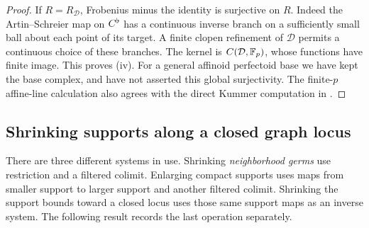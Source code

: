 \begin{proof}
If $R=R_{\mathcal D}$, Frobenius minus the identity is surjective
on $R$.  Indeed the Artin--Schreier map on $C^\flat$ has a
continuous inverse branch on a sufficiently small ball about
each point of its target.  A finite clopen refinement of
$\mathcal D$ permits a continuous choice of these branches.
The kernel is $C(\mathcal D,\mathbb F_p)$, whose functions have finite
image.  This proves (iv).  For a general affinoid perfectoid base
we have kept the base complex, and have not asserted this global
surjectivity.  The finite-$p$ affine-line calculation also agrees
with the direct Kummer computation in
\cite[Example~2.19, proof of Lemma~2.20, Equation~(2.22)]
{achingerGillesNiziol2025}.
\end{proof}


\subsection{Shrinking supports along a closed graph locus}

There are three different systems in use.  Shrinking
\emph{neighborhood germs} use restriction and a filtered colimit.
Enlarging compact supports uses maps from smaller support to
larger support and another filtered colimit.  Shrinking the
support bounds toward a closed locus uses those same support
maps as an inverse system.  The following result records the
last operation separately.

